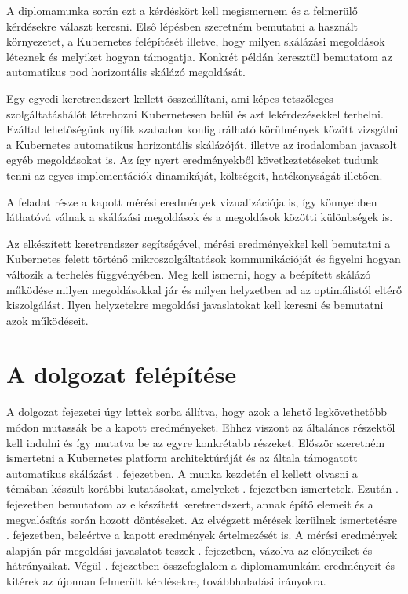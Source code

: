 A diplomamunka során ezt a kérdéskört kell megismernem és a felmerülő kérdésekre választ keresni. 
Első lépésben szeretném bemutatni a használt környezetet, a Kubernetes felépítését illetve, hogy milyen skálázási megoldások léteznek és melyiket hogyan támogatja.
Konkrét példán keresztül bemutatom az automatikus pod horizontális skálázó megoldását. 

Egy egyedi keretrendszert kellett összeállítani, ami képes tetszőleges szolgáltatáshálót létrehozni
Kubernetesen belül és azt lekérdezésekkel terhelni. Ezáltal lehetőségünk nyílik szabadon
konfigurálható körülmények között vizsgálni a Kubernetes automatikus horizontális skálázóját, illetve az irodalomban javasolt egyéb megoldásokat is.
Az így nyert eredményekből következtetéseket tudunk tenni az egyes implementációk dinamikáját, költségeit, hatékonyságát illetően.

A feladat része a kapott mérési eredmények vizualizációja is, így könnyebben láthatóvá válnak a
skálázási megoldások és a megoldások közötti különbségek is. 

Az elkészített keretrendszer segítségével, mérési eredményekkel kell bemutatni a Kubernetes felett történő mikroszolgáltatások kommunikációját és figyelni hogyan változik a terhelés függvényében.
Meg kell ismerni, hogy a beépített skálázó működése milyen megoldásokkal jár és milyen helyzetben ad az optimálistól eltérő kiszolgálást.
Ilyen helyzetekre megoldási javaslatokat kell keresni és bemutatni azok működéseit.

\section{A dolgozat felépítése}
A dolgozat fejezetei úgy lettek sorba állítva, hogy azok a lehető legkövethetőbb módon mutassák be a kapott eredményeket. Ehhez viszont az általános részektől kell indulni és így mutatva be az egyre konkrétabb részeket.
Először szeretném ismertetni a Kubernetes platform architektúráját és az általa támogatott automatikus skálázást . fejezetben.
A munka kezdetén el kellett olvasni a témában készült korábbi kutatásokat, amelyeket . fejezetben ismertetek.
Ezután . fejezetben bemutatom az elkészített keretrendszert, annak építő elemeit és a megvalósítás során hozott döntéseket. 
Az elvégzett mérések kerülnek ismertetésre . fejezetben, beleértve a kapott eredmények értelmezését is.
A mérési eredmények alapján pár megoldási javaslatot teszek . fejezetben, vázolva az előnyeiket és hátrányaikat. 
Végül . fejezetben összefoglalom a diplomamunkám eredményeit és kitérek az újonnan felmerült kérdésekre, továbbhaladási irányokra.
